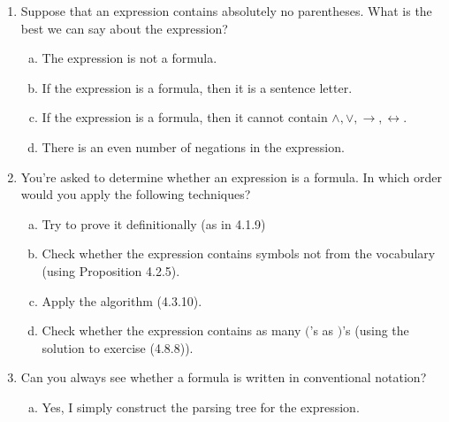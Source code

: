 	\begin{enumerate}[\thesection.1]

		\item Suppose that an expression contains absolutely no parentheses. What is the best we can say about the expression?
		
			\begin{enumerate}[(a)]

				\item The expression is not a formula.
				
				\item If the expression is a formula, then it is a sentence letter.
				
				\item If the expression is a formula, then it cannot contain $\land,\lor,\to,\leftrightarrow$.
				
				\item There is an even number of negations in the expression.
	
			\end{enumerate}
			
		\item You're asked to determine whether an expression is a formula. In which order would you apply the following techniques?
		
		\begin{enumerate}[(a)]
		
			\item Try to prove it definitionally (as in 4.1.9)
		
			\item Check whether the expression contains symbols not from the vocabulary (using Proposition 4.2.5).
			
			\item Apply the algorithm (4.3.10).
			
			\item Check whether the expression contains as many $($'s as $)$'s (using the solution to exercise (4.8.8)).
		
		\end{enumerate}
		
	\item Can you always see whether a formula is written in conventional notation?
	
	\begin{enumerate}[(a)]
	
		\item Yes, I simply construct the parsing tree for the expression.
		

\end{enumerate}
\end{enumerate}
